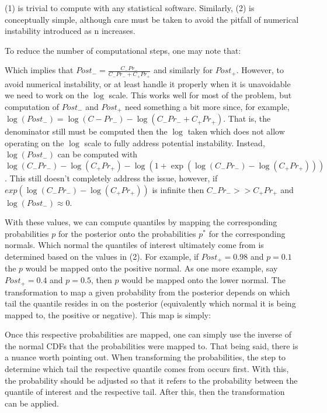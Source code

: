 (1) is trivial to compute with any statistical software. Similarly, (2) is conceptually simple, although care must be taken to avoid the pitfall of numerical instability introduced as n increases.

To reduce the number of computational steps, one may note that:


Which implies that $Post_- = \frac{C_{-} Pr_{-}}{C_{-} Pr_{-} + C_{+} Pr_{+}}$ and similarly for $Post_+$. However, to avoid numerical instability, or at least handle it properly when it is unavoidable we need to work on the $\log$ scale. This works well for most of the problem, but computation of $Post_-$ and $Post_+$ need something a bit more since, for example, $\log(Post_-) = \log(C{-}Pr_{-}) - \log(C_{-} Pr_{-} + C_{+} Pr_{+})$. That is, the denominator still must be computed then the $\log$ taken which does not allow operating on the $\log$ scale to fully address potential instability. Instead, $\log(Post_-)$ can be computed with $\log(C_-Pr_-) -  \log(C_+Pr_+) - \log(1 + \exp(\log(C_-Pr_-) -  \log(C_+Pr_+)))$. This still doesn't completely address the issue, however, if $exp(\log(C_-Pr_-) -  \log(C_+Pr_+))$ is infinite then $C_-Pr_- >> C_+Pr_+$ and $\log(Post_-) \approx 0$.

With these values, we can compute quantiles by mapping the corresponding probabilities $p$ for the posterior onto the probabilities $p^*$ for the corresponding normals. Which normal the quantiles of interest ultimately come from is determined based on the values in (2). For example, if $Post_{+} = 0.98$ and $p = 0.1$ the $p$ would be mapped onto the positive normal. As one more example, say $Post_{+} = 0.4$ and $p = 0.5$, then $p$ would be mapped onto the lower normal. The transformation to map a given probability from the posterior depends on which tail the quantile resides in on the posterior (equivalently which normal it is being mapped to, the positive or negative). This map is simply:


Once this respective probabilities are mapped, one can simply use the inverse of the normal CDFs that the probabilities were mapped to. That being said, there is a nuance worth pointing out. When transforming the probabilities, the step to determine which tail the respective quantile comes from occurs first. With this, the probability should be adjusted so that it refers to the probability between the quantile of interest and the respective tail. After this, then the transformation can be applied.

